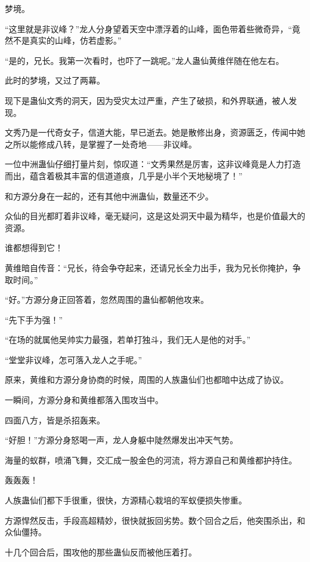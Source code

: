 
\begin{this_body}

梦境。

“这里就是非议峰？”龙人分身望着天空中漂浮着的山峰，面色带着些微奇异，“竟然不是真实的山峰，仿若虚影。”

“是的，兄长。我第一次看时，也吓了一跳呢。”龙人蛊仙黄维伴随在他左右。

此时的梦境，又过了两幕。

现下是蛊仙文秀的洞天，因为受灾太过严重，产生了破损，和外界联通，被人发现。

文秀乃是一代奇女子，信道大能，早已逝去。她是散修出身，资源匮乏，传闻中她之所以能修成八转，是掌握了一处奇地——非议峰。

一位中洲蛊仙仔细打量片刻，惊叹道：“文秀果然是厉害，这非议峰竟是人力打造而出，蕴含着极其丰富的信道道痕，几乎是小半个天地秘境了！”

和方源分身在一起的，还有其他中洲蛊仙，数量还不少。

众仙的目光都盯着非议峰，毫无疑问，这是这处洞天中最为精华，也是价值最大的资源。

谁都想得到它！

黄维暗自传音：“兄长，待会争夺起来，还请兄长全力出手，我为兄长你掩护，争取时间。”

“好。”方源分身正回答着，忽然周围的蛊仙都朝他攻来。

“先下手为强！”

“在场的就属他吴帅实力最强，若单打独斗，我们无人是他的对手。”

“堂堂非议峰，怎可落入龙人之手呢。”

原来，黄维和方源分身协商的时候，周围的人族蛊仙们也都暗中达成了协议。

一瞬间，方源分身和黄维都落入围攻当中。

四面八方，皆是杀招轰来。

“好胆！”方源分身怒喝一声，龙人身躯中陡然爆发出冲天气势。

海量的蚁群，喷涌飞舞，交汇成一股金色的河流，将方源自己和黄维都护持住。

轰轰轰！

人族蛊仙们都下手很重，很快，方源精心栽培的军蚁便损失惨重。

方源悍然反击，手段高超精妙，很快就扳回劣势。数个回合之后，他突围杀出，和众仙僵持。

十几个回合后，围攻他的那些蛊仙反而被他压着打。


\end{this_body}
